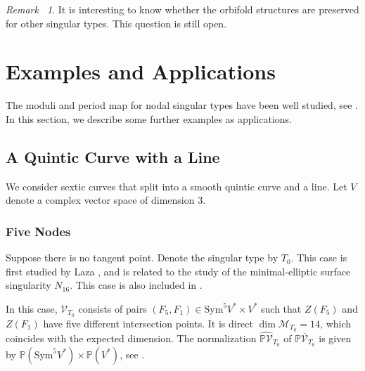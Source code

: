 \documentclass[12pt,reqno,a4paper]{amsart}
\theoremstyle{remark}
\newtheorem{rmk}[thm]{Remark~}
\theoremstyle{definition}
\newcommand{\PP}{\mathbb{P}}
\newcommand{\calM}{\mathcal{M}}
\newcommand{\calV}{\mathcal{V}}
\newcommand\Sym{\mathrm{Sym}}
\begin{document}
\begin{rmk}
    It is interesting to know whether the orbifold structures are preserved for other singular types. This question is still open.
\end{rmk}











\section{Examples and Applications}
\label{sec: examples and applications}
The moduli and period map for nodal singular types have been well studied, see \cite{yu2023moduli}. 
In this section, we describe some further examples as applications. 

\subsection{A Quintic Curve with a Line}
We consider sextic curves that split into a smooth quintic curve and a line.
Let $V$ denote a complex vector space of dimension $3$.

\subsubsection{Five Nodes}
Suppose there is no tangent point. Denote the singular type by $T_0$. This case is first studied by Laza \cite{laza2009deformations}, and is related to the study of the minimal-elliptic surface singularity $N_{16}$.
This case is also included in \cite{yu2023moduli}.

In this case, $\calV_{T_0}$ consists of pairs $(F_5,F_1)\in \Sym^5 V^*\times V^*$ such that $Z(F_5)$ and $Z(F_1)$ have five different intersection points.
It is direct $\dim \calM_{T_0}=14$, which coincides with the expected dimension. The normalization $\widehat{\PP\calV}_{T_0}$ of $\PP\overline{\calV}_{T_0}$ is given by $\PP(\Sym^5 V^*) \times \PP(V^*)$, see \cite[\S 4.2]{yu2023moduli}.
\end{document}
